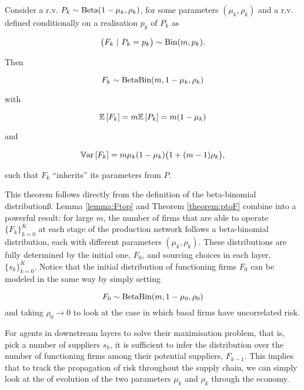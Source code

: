 \documentclass[../../main.tex]{subfiles}
\begin{document}
\begin{theorem} \label{theorem:ptoF}
  Consider a r.v. $P_k \sim \text{Beta}(1 - \mu_k, \rho_k)$, for some parameters $(\mu_k, \rho_k)$ and a r.v. defined conditionally on a realisation $p_k$ of $P_k$ as 
  
  \begin{equation}
    \big(F_k \ \vert \ P_k = p_k \big) \sim \text{Bin}(m, p_k).
  \end{equation}

  Then

  \begin{equation}
    F_k \sim \text{Beta}\text{Bin}(m, 1 - \mu_k, \rho_k)
  \end{equation}

  with

  \begin{equation} \label{eq:mean_of_F}
    \mathbb{E} \left[F_k\right] = m \mathbb{E} \left[P_k\right] = m (1 - \mu_k)
  \end{equation}

  and 

  \begin{equation} \label{eq:var_of_F}
    \mathbb{V}\text{ar} \left[F_k\right] = m \mu_k (1 - \mu_k) \big(1 + (m - 1) \rho_k\big),
  \end{equation}

  such that $F_k$ ``inherits'' its parameters from $P$.
\end{theorem}

This theorem follows directly from the definition of the beta-binomial distributionß. Lemma \ref*{lemma:Ftop} and Theorem \ref*{theorem:ptoF} combine into a powerful result: for large $m$, the number of firms that are able to operate $\{F_k\}^{K}_{k = 0}$ at each stage of the production network follows a beta-binomial distribution, each with different parameters $(\mu_k, \rho_k)$. These distributions are fully determined by the initial one, $F_0$, and sourcing choices in each layer, $\{s_k\}^{K}_{k = 0}$. Notice that the initial distribution of functioning firms $F_0$ can be modeled in the same way by simply setting 

\begin{equation}
  F_0 \sim \text{Beta}\text{Bin}(m, 1 - \mu_0, \rho_0)
\end{equation} and taking $\rho_0 \rightarrow 0$ to look at the case in which basal firms have uncorrelated risk.

For agents in downstream layers to solve their maximisation problem, that is, pick a number of suppliers $s_k$, it is sufficient to infer the distribution over the number of functioning firms among their potential suppliers, $F_{k - 1}$. This implies that to track the propagation of risk throughout the supply chain, we can simply look at the of evolution of the two parameters $\mu_k$ and $\rho_k$ through the economy.
\end{document}
